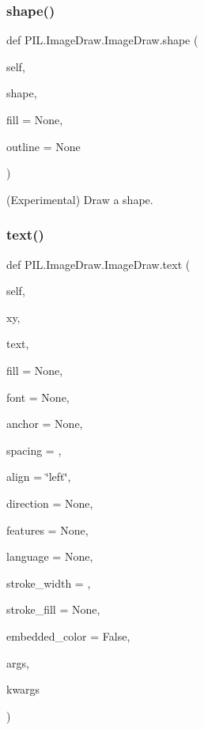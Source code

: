 \subsubsection{\texorpdfstring{shape()}{shape()}}
{\footnotesize\ttfamily def P\+I\+L.\+Image\+Draw.\+Image\+Draw.\+shape (\begin{DoxyParamCaption}\item[{}]{self,  }\item[{}]{shape,  }\item[{}]{fill = {\ttfamily None},  }\item[{}]{outline = {\ttfamily None} }\end{DoxyParamCaption})}

\begin{DoxyVerb}(Experimental) Draw a shape.\end{DoxyVerb}
 \mbox{\label{classPIL_1_1ImageDraw_1_1ImageDraw_a13be584a7af12b6ed0b118bfb15f6030}} 
\subsubsection{\texorpdfstring{text()}{text()}}
{\footnotesize\ttfamily def P\+I\+L.\+Image\+Draw.\+Image\+Draw.\+text (\begin{DoxyParamCaption}\item[{}]{self,  }\item[{}]{xy,  }\item[{}]{text,  }\item[{}]{fill = {\ttfamily None},  }\item[{}]{font = {\ttfamily None},  }\item[{}]{anchor = {\ttfamily None},  }\item[{}]{spacing = {},  }\item[{}]{align = {\ttfamily \char`\"{}left\char`\"{}},  }\item[{}]{direction = {\ttfamily None},  }\item[{}]{features = {\ttfamily None},  }\item[{}]{language = {\ttfamily None},  }\item[{}]{stroke\+\_\+width = {},  }\item[{}]{stroke\+\_\+fill = {\ttfamily None},  }\item[{}]{embedded\+\_\+color = {\ttfamily False},  }\item[{}]{args,  }\item[{}]{kwargs }\end{DoxyParamCaption})}

